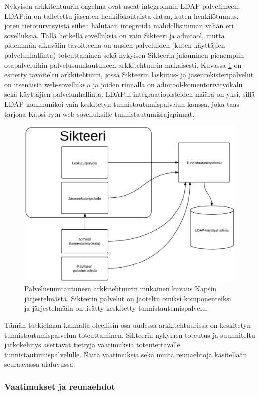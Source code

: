 Nykyisen arkkitehtuurin ongelma ovat useat integroinnin LDAP-palvelimeen. LDAP:in on talletettu jäsenten henkilökohtaista dataa, kuten henkilötunnus, joten tietoturvasyistä siihen halutaan integroida mahdollisimman vähän eri sovelluksia. Tällä hetkellä sovelluksia on vain Sikteeri ja admtool, mutta pidemmän aikavälin tavoitteena on uusien palveluiden (kuten käyttäjien palvelunhallinta) toteuttaminen sekä nykyisen Sikteerin jakaminen pienempiin osapalveluihin palvelusuuntautuneen arkkitehtuurin mukaisesti. Kuvassa \ref{kapsi_uusi} on esitetty tavoiteltu arkkitehtuuri, jossa Sikteerin laskutus- ja jäsenrekisteripalvelut on itsenäisiä web-sovelluksia ja joiden rinnalla on admtool-komentorivityökalu sekä käyttäjien palvelunhallinta. LDAP:n integraatiopisteiden määrä on yksi, sillä LDAP kommunikoi vain keskitetyn tunnistautumispalvelun kanssa, joka taas tarjoaa Kapsi ry:n web-sovelluksille tunnistautumisrajapinnat.

\begin{figure}[ht]
\centering
\includegraphics[width=.7\textwidth]{toteutus/kapsi_uusi.eps}
\caption{Palvelusuuntautuneen arkkitehtuurin mukainen kuvaus Kapsin järjestelmästä. Sikteerin palvelut on jaoteltu omiksi komponenteiksi ja järjestelmään on lisätty keskitetty tunnistautumispalvelu.}%
\label{kapsi_uusi}
\end{figure}

Tämän tutkielman kannalta oleellisin osa uudessa arkkitehtuurissa on keskitetyn tunnistautumispalvelun toteuttaminen. Sikteerin nykyinen toteutus ja suunniteltu jatkokehitys asettavat tiettyjä vaatimuksia toteutettavalle tunnistautumispalvelulle. Näitä vaatimuksia sekä muita reunaehtoja käsitellään seuraavassa alaluvussa.

\subsubsection{Vaatimukset ja reunaehdot}
